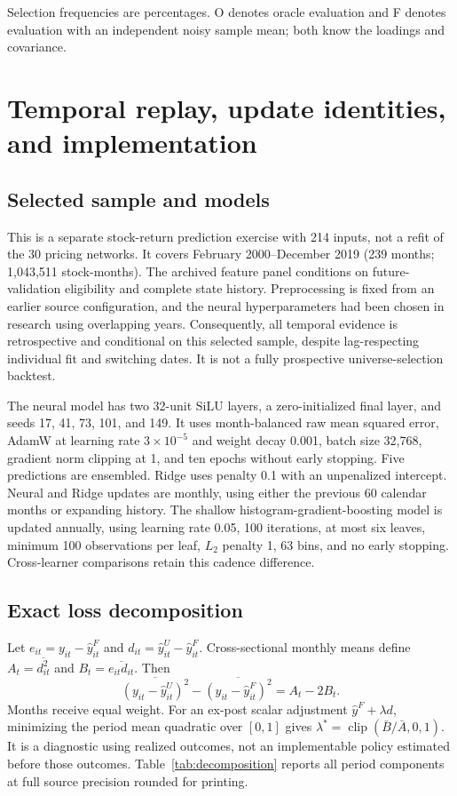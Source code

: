 \documentclass[11pt]{article}
\begin{document}
Selection frequencies are percentages. O denotes oracle evaluation and F denotes evaluation with an independent noisy sample mean; both know the loadings and covariance.\par


\section{Temporal replay, update identities, and implementation}
\setcounter{equation}{0}
\subsection{Selected sample and models}
This is a separate stock-return prediction exercise with 214 inputs, not a refit of the 30 pricing networks. It covers February 2000--December 2019 (239 months; 1,043,511 stock-months). The archived feature panel conditions on future-validation eligibility and complete state history. Preprocessing is fixed from an earlier source configuration, and the neural hyperparameters had been chosen in research using overlapping years. Consequently, all temporal evidence is retrospective and conditional on this selected sample, despite lag-respecting individual fit and switching dates. It is not a fully prospective universe-selection backtest.

The neural model has two 32-unit SiLU layers, a zero-initialized final layer, and seeds 17, 41, 73, 101, and 149. It uses month-balanced raw mean squared error, AdamW at learning rate $3\times10^{-5}$ and weight decay 0.001, batch size 32,768, gradient norm clipping at 1, and ten epochs without early stopping. Five predictions are ensembled. Ridge uses penalty 0.1 with an unpenalized intercept. Neural and Ridge updates are monthly, using either the previous 60 calendar months or expanding history. The shallow histogram-gradient-boosting model is updated annually, using learning rate 0.05, 100 iterations, at most six leaves, minimum 100 observations per leaf, $L_2$ penalty 1, 63 bins, and no early stopping. Cross-learner comparisons retain this cadence difference.

\subsection{Exact loss decomposition}
Let $e_{it}=y_{it}-\hat y^F_{it}$ and $d_{it}=\hat y^U_{it}-\hat y^F_{it}$. Cross-sectional monthly means define $A_t=\overline{d_{it}^2}$ and $B_t=\overline{e_{it}d_{it}}$. Then
\begin{equation}
\overline{(y_{it}-\hat y^U_{it})^2}-\overline{(y_{it}-\hat y^F_{it})^2}=A_t-2B_t.
\label{eq:s-update-decomp}
\end{equation}
Months receive equal weight. For an ex-post scalar adjustment $\hat y^F+\lambda d$, minimizing the period mean quadratic over $[0,1]$ gives $\lambda^*=\operatorname{clip}(\bar B/\bar A,0,1)$. It is a diagnostic using realized outcomes, not an implementable policy estimated before those outcomes. Table~\ref{tab:decomposition} reports all period components at full source precision rounded for printing.
\end{document}
